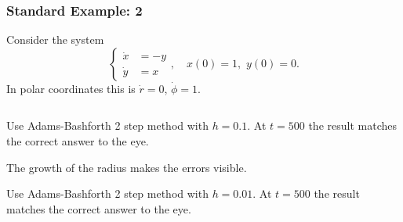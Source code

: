 \documentclass{beamer}
\begin{document}
\begin{frame}
  \frametitle{Standard Example: 2}


  Consider the system
  \begin{equation*}
    \left\{
      \begin{aligned}
        \dot{x} & = -y \\ \dot{y} & = x
      \end{aligned} \right., \quad x(0) = 1, \, \, y(0) = 0.
  \end{equation*}
  In polar coordinates this is $\dot{r} = 0$, $\dot{\phi} = 1$.
  \begin{columns}
    \begin{column}{0.5\textwidth}
      \begin{overlayarea}{\textwidth}{0.4\textheight}
        {
          Use Adams-Bashforth 2 step method with $h=0.1$. At $t=500$
          the result matches the correct answer to the eye.
        }
        {

          \vspace{1ex}
          The growth of the radius makes the errors visible.
        }
        {
          Use Adams-Bashforth 2 step method with $h=0.01$. At $t=500$
          the result matches the correct answer to the eye.
        }
        {

}
\end{overlayarea}
\end{column}
\end{columns}
\end{frame}
\end{document}
